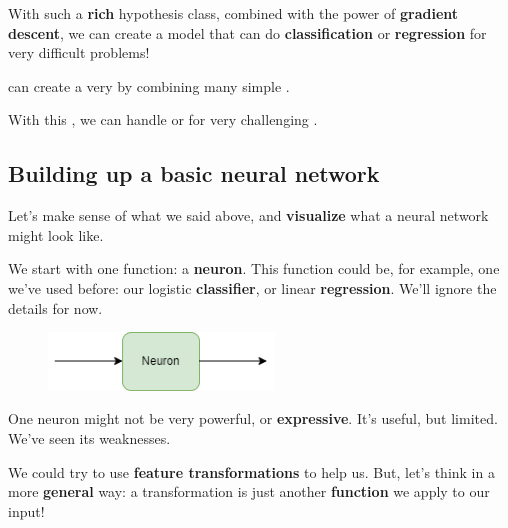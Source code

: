        With such a \textbf{rich} hypothesis class, combined with the power of \textbf{gradient descent}, we can create a model that can do \textbf{classification} or \textbf{regression} for very difficult problems!
            \\
            
        \begin{concept}
             can create a very  by combining many simple .
            
            With this , we can handle  or  for very challenging .
        \end{concept}
    
    \subsection{Building up a basic neural network}
        
        Let's make sense of what we said above, and \textbf{visualize} what a neural network might look like.
        
        We start with one function: a \textbf{neuron}. This function could be, for example, one we've used before: our logistic \textbf{classifier}, or linear \textbf{regression}. We'll ignore the details for now.
       
        \begin{figure}[H]
            \centering
            \includegraphics[width=60mm,scale=0.4]{images/nn_images/neuron.png}
        \end{figure}
       
        One neuron might not be very powerful, or \textbf{expressive}. It's useful, but limited. We've seen its weaknesses.
       
        We could try to use \textbf{feature transformations} to help us. But, let's think in a more \textbf{general} way: a transformation is just another \textbf{function} we apply to our input!
       
